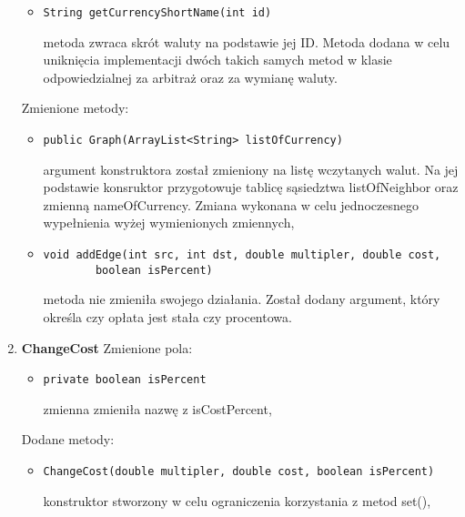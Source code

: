 \documentclass[12pt]{article}
\begin{document}
\begin{enumerate}
\begin{itemize}
    \end{itemize}
    \begin{itemize}
        \item \begin{verbatim}String getCurrencyShortName(int id)\end{verbatim}
        metoda zwraca skrót waluty na podstawie jej ID. Metoda dodana w celu uniknięcia implementacji dwóch takich samych metod w klasie odpowiedzialnej za arbitraż oraz za wymianę waluty.
    \end{itemize}
    Zmienione metody:
    \begin{itemize}
        \item \begin{verbatim}public Graph(ArrayList<String> listOfCurrency)\end{verbatim}
        argument konstruktora został zmieniony na listę wczytanych walut. Na jej podstawie konsruktor przygotowuje tablicę sąsiedztwa listOfNeighbor oraz zmienną nameOfCurrency. Zmiana wykonana w celu jednoczesnego wypełnienia wyżej wymienionych zmiennych,
    \end{itemize}
    \begin{itemize}
        \item \begin{verbatim}void addEdge(int src, int dst, double multipler, double cost,
        boolean isPercent)\end{verbatim}
        metoda nie zmieniła swojego działania. Został dodany argument, który określa czy opłata jest stała czy procentowa.
    \end{itemize}
\item \textbf{ChangeCost}
\newline\newline
   Zmienione pola:
    \begin{itemize}
        \item \begin{verbatim}private boolean isPercent\end{verbatim}
        zmienna zmieniła nazwę z isCostPercent,
    \end{itemize}
    Dodane metody:
     \begin{itemize}
    \item \begin{verbatim}ChangeCost(double multipler, double cost, boolean isPercent)\end{verbatim}
        konstruktor stworzony w celu ograniczenia korzystania z metod set(),
    \end{itemize}

\end{enumerate}
\end{document}
